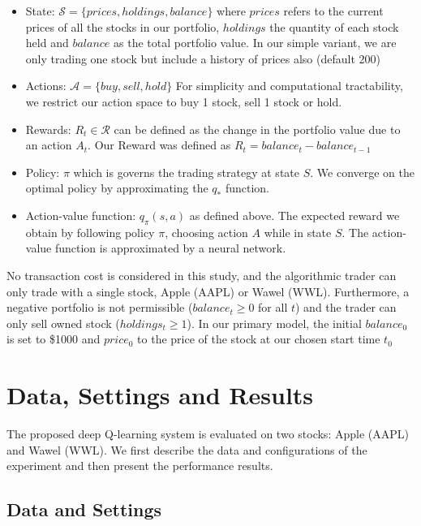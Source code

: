\documentclass[12pt, authoryear]{elsarticle}
\begin{document}
\begin{itemize}
	\item State: $\mathcal{S} = \{prices,holdings,balance\} $ where $prices$ refers to the current prices of all the stocks in our portfolio, $holdings$ the quantity of each stock held and $balance$ as the total portfolio value. In our simple variant, we are only trading one stock but include a history of prices also (default 200)
	\item Actions: $\mathcal{A} = \{buy,sell,hold\}$ For simplicity and computational tractability, we restrict our action space to buy 1 stock, sell 1 stock or hold.
	\item Rewards: $R_{t} \in \mathcal{R}$ can be defined as the change in the portfolio value due to an action $A_{t}$. Our Reward was defined as $R_{t} = balance_{t} - balance_{t-1}$
	\item Policy: $\pi$ which is governs the trading strategy at state $S$. We converge on the optimal policy by approximating the $q_{*}$ function.
	\item Action-value function: $q_{\pi}(s,a)$ as defined above. The expected reward we obtain by following policy $\pi$, choosing action $A$ while in state $S$. The action-value function is approximated by a neural network.
\end{itemize}



No transaction cost is considered in this study, and the algorithmic trader can only trade with a single stock, Apple (AAPL) or Wawel (WWL). Furthermore, a negative portfolio is not permissible ($balance_{t} \geq 0$ for all $t$) and the trader can only sell owned stock ($holdings_{t} \geq 1$). In our primary model, the initial $balance_{0}$ is set to \$1000 and $price_{0}$ to the price of the stock at our chosen start time $t_{0}$ 

\section{Data, Settings and  Results}

The proposed deep Q-learning system is evaluated on two stocks: Apple (AAPL) and Wawel (WWL). We first describe the data and configurations of the experiment and then present the performance results.

\subsection{Data and Settings}
\end{document}
